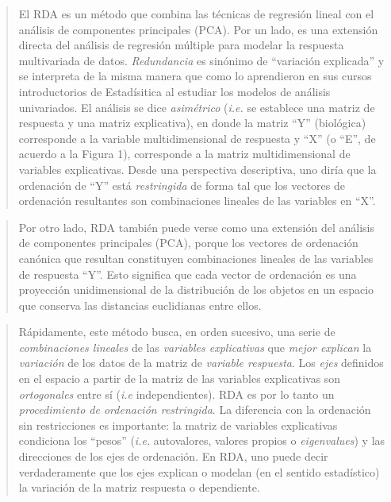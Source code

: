 \documentclass[
]{book}
\begin{document}
\begin{quote}
El RDA es un método que combina las técnicas de regresión lineal con el análisis de componentes principales (PCA). Por un lado, es una extensión directa del análisis de regresión múltiple para modelar la respuesta multivariada de datos. \emph{Redundancia} es sinónimo de ``variación explicada'' y se interpreta de la misma manera que como lo aprendieron en sus cursos introductorios de Estadísitica al estudiar los modelos de análisis univariados. El análisis se dice \emph{asimétrico} (\emph{i.e.} se establece una matriz de respuesta y una matriz explicativa), en donde la matriz ``Y'' (biológica) corresponde a la variable multidimensional de respuesta y ``X'' (o ``E'', de acuerdo a la Figura 1), corresponde a la matriz multidimensional de variables explicativas. Desde una perspectiva descriptiva, uno diría que la ordenación de ``Y'' está \emph{restringida} de forma tal que los vectores de ordenación resultantes son combinaciones lineales de las variables en ``X''.
\end{quote}

\begin{quote}
Por otro lado, RDA también puede verse como una extensión del análisis de componentes principales (PCA), porque los vectores de ordenación canónica que resultan constituyen combinaciones lineales de las variables de respuesta ``Y''. Esto significa que cada vector de ordenación es una proyección unidimensional de la distribución de los objetos en un espacio que conserva las distancias euclidianas entre ellos.
\end{quote}

\begin{quote}
Rápidamente, este método busca, en orden sucesivo, una serie de \emph{combinaciones lineales} de las \emph{variables explicativas} que \emph{mejor explican} la \emph{variación} de los datos de la matriz de \emph{variable respuesta}. Los \emph{ejes} definidos en el espacio a partir de la matriz de las variables explicativas son \emph{ortogonales} entre sí (\emph{i.e} independientes). RDA es por lo tanto un \emph{procedimiento de ordenación restringida}. La diferencia con la ordenación sin restricciones es importante: la matriz de variables explicativas condiciona los ``pesos'' (\emph{i.e.} autovalores, valores propios o \emph{eigenvalues}) y las direcciones de los ejes de ordenación. En RDA, uno puede decir verdaderamente que los ejes explican o modelan (en el sentido estadístico) la variación de la matriz respuesta o dependiente.
\end{quote}
\end{document}
